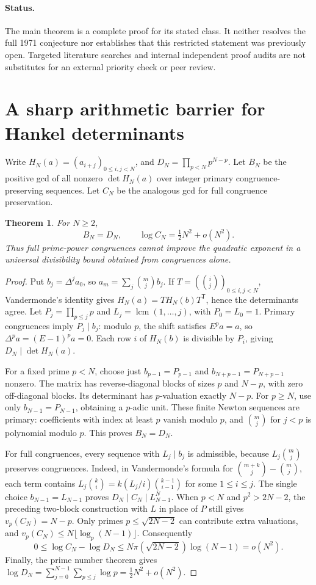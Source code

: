 \documentclass[11pt,a4paper]{article}
\newtheorem{theorem}{Theorem}[section]
\theoremstyle{remark}\newtheorem{remark}[theorem]{Remark}
\newcommand{\lcm}{\operatorname{lcm}}
\begin{document}
\paragraph{Status.}
The main theorem is a complete proof for its stated class. It neither resolves
the full 1971 conjecture nor establishes that this restricted statement was
previously open. Targeted literature searches and internal independent
proof audits are not substitutes for an external priority check or peer review.

\appendix
\section{A sharp arithmetic barrier for Hankel determinants}

Write $H_N(a)=(a_{i+j})_{0\le i,j<N}$, and
$D_N=\prod_{p<N}p^{N-p}$. Let $B_N$ be the positive gcd of all nonzero
$\det H_N(a)$ over integer primary congruence-preserving sequences. Let $C_N$
be the analogous gcd for full congruence preservation.

\begin{theorem}\label{thm:gcd}
For $N\ge2$,
\[
 B_N=D_N,\qquad \log C_N=\tfrac12N^2+o(N^2).
\]
Thus full prime-power congruences cannot improve the quadratic exponent in a
universal divisibility bound obtained from congruences alone.
\end{theorem}

\begin{proof}
Put $b_j=\Delta^j a_0$, so $a_m=\sum_j\binom mj b_j$.
If $T=(\binom ij)_{0\le i,j<N}$, Vandermonde's identity gives
$H_N(a)=T H_N(b)T^{\mathsf T}$, hence the determinants agree.
Let $P_j=\prod_{p\le j}p$ and $L_j=\lcm(1,\ldots,j)$, with $P_0=L_0=1$.
Primary congruences imply $P_j\mid b_j$: modulo $p$, the shift satisfies
$E^p a=a$, so $\Delta^p a=(E-1)^p a=0$. Each row $i$ of $H_N(b)$ is
divisible by $P_i$, giving $D_N\mid\det H_N(a)$.

For a fixed prime $p<N$, choose just
$b_{p-1}=P_{p-1}$ and $b_{N+p-1}=P_{N+p-1}$ nonzero.
The matrix has reverse-diagonal blocks of sizes $p$ and $N-p$, with zero
off-diagonal blocks. Its determinant has $p$-valuation exactly $N-p$.
For $p\ge N$, use only $b_{N-1}=P_{N-1}$, obtaining a $p$-adic unit.
These finite Newton sequences are primary: coefficients with index at least
$p$ vanish modulo $p$, and $\binom mj$ for $j<p$ is polynomial modulo $p$.
This proves $B_N=D_N$.

For full congruences, every sequence with $L_j\mid b_j$ is admissible,
because $L_j\binom mj$ preserves congruences. Indeed, in Vandermonde's
formula for $\binom{m+k}{j}-\binom mj$, each term contains
$L_j\binom ki=k(L_j/i)\binom{k-1}{i-1}$ for some $1\le i\le j$.
The single choice $b_{N-1}=L_{N-1}$ proves
$D_N\mid C_N\mid L_{N-1}^N$.
When $p<N$ and $p^2>2N-2$, the preceding two-block construction with $L$
in place of $P$ still gives $v_p(C_N)=N-p$.
Only primes $p\le\sqrt{2N-2}$ can contribute extra valuations, and
$v_p(C_N)\le N\lfloor\log_p(N-1)\rfloor$. Consequently
\[
 0\le\log C_N-\log D_N
 \le N\pi(\sqrt{2N-2})\log(N-1)=o(N^2).
\]
Finally, the prime number theorem gives
$\log D_N=\sum_{j=0}^{N-1}\sum_{p\le j}\log p=\tfrac12N^2+o(N^2)$.
\end{proof}
\end{document}
